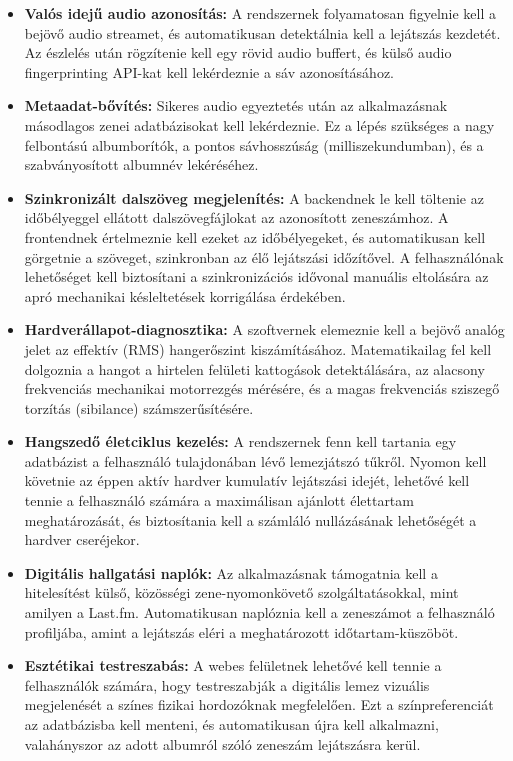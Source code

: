 \documentclass[12pt,a4paper,hungarian]{report}
\begin{document}
\begin{itemize}
    \item \textbf{Valós idejű audio azonosítás:} A rendszernek folyamatosan figyelnie kell a bejövő audio streamet, és automatikusan detektálnia kell a lejátszás kezdetét. Az észlelés után rögzítenie kell egy rövid audio buffert, és külső audio fingerprinting API-kat kell lekérdeznie a sáv azonosításához.
    \item \textbf{Metaadat-bővítés:} Sikeres audio egyeztetés után az alkalmazásnak másodlagos zenei adatbázisokat kell lekérdeznie. Ez a lépés szükséges a nagy felbontású albumborítók, a pontos sávhosszúság (milliszekundumban), és a szabványosított albumnév lekéréséhez.
    \item \textbf{Szinkronizált dalszöveg megjelenítés:} A backendnek le kell töltenie az időbélyeggel ellátott dalszövegfájlokat az azonosított zeneszámhoz. A frontendnek értelmeznie kell ezeket az időbélyegeket, és automatikusan kell görgetnie a szöveget, szinkronban az élő lejátszási időzítővel. A felhasználónak lehetőséget kell biztosítani a szinkronizációs idővonal manuális eltolására az apró mechanikai késleltetések korrigálása érdekében.
    \item \textbf{Hardverállapot-diagnosztika:} A szoftvernek elemeznie kell a bejövő analóg jelet az effektív (RMS) hangerőszint kiszámításához. Matematikailag fel kell dolgoznia a hangot a hirtelen felületi kattogások detektálására, az alacsony frekvenciás mechanikai motorrezgés mérésére, és a magas frekvenciás sziszegő torzítás (sibilance) számszerűsítésére.
    \item \textbf{Hangszedő életciklus kezelés:} A rendszernek fenn kell tartania egy adatbázist a felhasználó tulajdonában lévő lemezjátszó tűkről. Nyomon kell követnie az éppen aktív hardver kumulatív lejátszási idejét, lehetővé kell tennie a felhasználó számára a maximálisan ajánlott élettartam meghatározását, és biztosítania kell a számláló nullázásának lehetőségét a hardver cseréjekor.
    \item \textbf{Digitális hallgatási naplók:} Az alkalmazásnak támogatnia kell a hitelesítést külső, közösségi zene-nyomonkövető szolgáltatásokkal, mint amilyen a Last.fm. Automatikusan naplóznia kell a zeneszámot a felhasználó profiljába, amint a lejátszás eléri a meghatározott időtartam-küszöböt.
    \item \textbf{Esztétikai testreszabás:} A webes felületnek lehetővé kell tennie a felhasználók számára, hogy testreszabják a digitális lemez vizuális megjelenését a színes fizikai hordozóknak megfelelően. Ezt a színpreferenciát az adatbázisba kell menteni, és automatikusan újra kell alkalmazni, valahányszor az adott albumról szóló zeneszám lejátszásra kerül.
\end{itemize}
\end{document}
